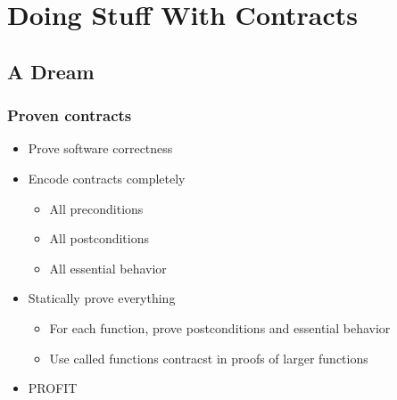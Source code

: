 
\section{Doing Stuff With Contracts}
\begin{frame}
\end{frame}


\subsection{A Dream}
\begin{frame}

  \frametitle{Proven contracts}

  \begin{itemize}
  \item Prove software correctness \pause
    \item Encode contracts completely \pause
      \begin{itemize}
      \item All preconditions \pause
      \item All postconditions \pause
      \item All essential behavior \pause
      \end{itemize}
    \item Statically prove everything \pause
      \begin{itemize}
      \item For each function, prove postconditions and essential behavior \pause
      \item Use called functions contracst in proofs of larger functions \pause
      \end{itemize}
    \item PROFIT
  \end{itemize}
  

%    
%
\end{frame}

